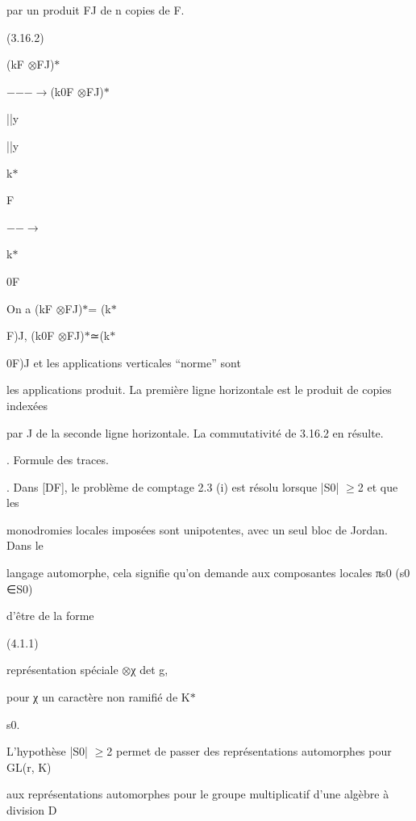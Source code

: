 \documentclass[11pt]{article}
\begin{document}
\noindent par un produit FJ de n copies de F.\par
\noindent (3.16.2)\par
\noindent (kF \(\otimes\)FJ)\(*\)\par
\noindent [N\(\otimes\)Fj]\par
\noindent −−−\(\to\)(k0F \(\otimes\)FJ)\(*\)\par
\noindent ||y\par
\noindent ||y\par
\noindent k\(*\)\par
\noindent F\par
\noindent [N]\par
\noindent −−\(\to\)\par
\noindent k\(*\)\par
\noindent 0F\par
\noindent On a (kF \(\otimes\)FJ)\(*\)= (k\(*\)\par
\noindent F)J, (k0F \(\otimes\)FJ)\(*\)≃(k\(*\)\par
\noindent 0F)J et les applications verticales “norme” sont\par
\noindent les applications produit. La première ligne horizontale est le produit de copies indexées\par
\noindent par J de la seconde ligne horizontale. La commutativité de 3.16.2 en résulte.\par
{}. Formule des traces.\par
{}. Dans [DF], le problème de comptage 2.3 (i) est résolu lorsque |S0| \(\geq\)2 et que les\par
\noindent monodromies locales imposées sont unipotentes, avec un seul bloc de Jordan. Dans le\par
\noindent langage automorphe, cela signifie qu’on demande aux composantes locales πs0 (s0 ∈S0)\par
\noindent d’être de la forme\par
\noindent (4.1.1)\par
\noindent représentation spéciale \(\otimes\)χ det g,\par
\noindent pour χ un caractère non ramifié de K\(*\)\par
\noindent s0.\par
\noindent L’hypothèse |S0| \(\geq\)2 permet de passer des représentations automorphes pour GL(r, K)\par
\noindent aux représentations automorphes pour le groupe multiplicatif d’une algèbre à division D\par
\end{document}
